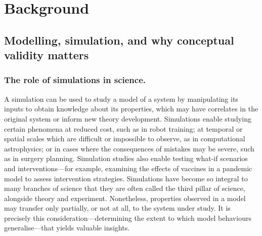\chapter{Background}

\section{Modelling, simulation, and why conceptual validity matters}
\label{sec:background_simulation}

\subsection{The role of simulations in science.}
A simulation can be used to study a model of a system by manipulating its inputs to obtain knowledge about its properties, which may have correlates in the original system or inform new theory development. Simulations enable studying certain phenomena at reduced cost, such as in robot training; at temporal or spatial scales which are difficult or impossible to observe, as in computational astrophysics; or in cases where the consequences of mistakes may be severe, such as in surgery planning. Simulation studies also enable testing what-if scenarios and interventions—for example, examining the effects of vaccines in a pandemic model to assess intervention strategies.
Simulations have become so integral to many branches of science that they are often called the third pillar of science, alongside theory and experiment. Nonetheless, properties observed in a model may transfer only partially, or not at all, to the system under study. It is precisely this consideration—determining the extent to which model behaviours generalise—that yields valuable insights.

